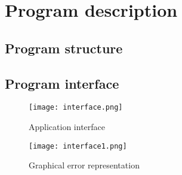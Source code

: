 \documentclass[a4paper,12pt]{article}
\begin{document}
\section{Program description}

\subsection{Program structure}

\subsection{Program interface}
\begin{figure}[h]
 \centering
 \texttt{[image: interface.png]}
 \caption{Application interface}
\end{figure}

\begin{figure}[h]
 \centering
 \texttt{[image: interface1.png]}
 \caption{Graphical error representation}
\end{figure}
\end{document}
